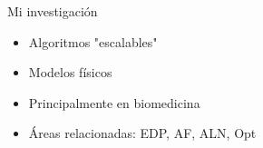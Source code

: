 \documentclass[14pt,aspectratio=169,xcolor=dvipsnames]{beamer}
\begin{document}
\begin{frame}{Mi investigación}
    \begin{itemize}
        \item Algoritmos "escalables"
        \item Modelos físicos
        \item Principalmente en biomedicina
        \item Áreas relacionadas: EDP, AF, ALN, Opt
    \end{itemize}
\end{frame}
\begin{frame}
    \maketitle
\end{frame}
\end{document}
